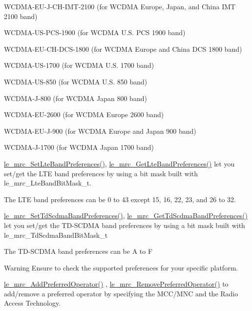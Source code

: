 \begin{DoxyItemize}
\item W\+C\+D\+M\+A-\/\+E\+U-\/\+J-\/\+C\+H-\/\+I\+M\+T-\/2100 (for W\+C\+D\+MA Europe, Japan, and China I\+MT 2100 band)
\item W\+C\+D\+M\+A-\/\+U\+S-\/\+P\+C\+S-\/1900 (for W\+C\+D\+MA U.\+S. P\+CS 1900 band)
\item W\+C\+D\+M\+A-\/\+E\+U-\/\+C\+H-\/\+D\+C\+S-\/1800 (for W\+C\+D\+MA Europe and China D\+CS 1800 band)
\item W\+C\+D\+M\+A-\/\+U\+S-\/1700 (for W\+C\+D\+MA U.\+S. 1700 band)
\item W\+C\+D\+M\+A-\/\+U\+S-\/850 (for W\+C\+D\+MA U.\+S. 850 band)
\item W\+C\+D\+M\+A-\/\+J-\/800 (for W\+C\+D\+MA Japan 800 band)
\item W\+C\+D\+M\+A-\/\+E\+U-\/2600 (for W\+C\+D\+MA Europe 2600 band)
\item W\+C\+D\+M\+A-\/\+E\+U-\/\+J-\/900 (for W\+C\+D\+MA Europe and Japan 900 band)
\item W\+C\+D\+M\+A-\/\+J-\/1700 (for W\+C\+D\+MA Japan 1700 band)
\end{DoxyItemize}

\hyperlink{le__mrc__interface_8h_a21d2fe7c736e9a4a342dcc461a5d6e02}{le\+\_\+mrc\+\_\+\+Set\+Lte\+Band\+Preferences()}, \hyperlink{le__mrc__interface_8h_af4ec5bd36ba8df68bc12a10618268742}{le\+\_\+mrc\+\_\+\+Get\+Lte\+Band\+Preferences()} let you set/get the L\+TE band preferences by using a bit mask built with {\ttfamily le\+\_\+mrc\+\_\+\+Lte\+Band\+Bit\+Mask\+\_\+t}.

The L\+TE band preferences can be 0 to 43 except 15, 16, 22, 23, and 26 to 32.

\hyperlink{le__mrc__interface_8h_a8765511597189b64e486fa8f17bcddcd}{le\+\_\+mrc\+\_\+\+Set\+Td\+Scdma\+Band\+Preferences()}, \hyperlink{le__mrc__interface_8h_aed41544004ed7df9de8e874b8bb09d3b}{le\+\_\+mrc\+\_\+\+Get\+Td\+Scdma\+Band\+Preferences()} let you set/get the T\+D-\/\+S\+C\+D\+MA band preferences by using a bit mask built with {\ttfamily le\+\_\+mrc\+\_\+\+Td\+Scdma\+Band\+Bit\+Mask\+\_\+t} 

The T\+D-\/\+S\+C\+D\+MA band preferences can be \textquotesingle{}A\textquotesingle{} to \textquotesingle{}F\textquotesingle{}

\begin{DoxyWarning}{Warning}
Ensure to check the supported preferences for your specific platform.
\end{DoxyWarning}
\hyperlink{le__mrc__interface_8h_a5128219051d27ee12711744aafd48418}{le\+\_\+mrc\+\_\+\+Add\+Preferred\+Operator()} , \hyperlink{le__mrc__interface_8h_ad974cf77b5ccce8e36495aab315dd3e4}{le\+\_\+mrc\+\_\+\+Remove\+Preferred\+Operator()} to add/remove a preferred operator by specifying the M\+C\+C/\+M\+NC and the Radio Access Technology.

